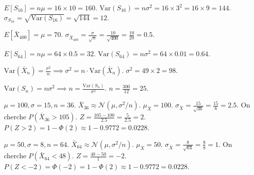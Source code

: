 \begin{correctionbox}
$E[S_{16}] = n\mu = 16 \times 10 = 160$.
$\text{Var}(S_{16}) = n\sigma^2 = 16 \times 3^2 = 16 \times 9 = 144$.
$\sigma_{S_{16}} = \sqrt{\text{Var}(S_{16})} = \sqrt{144} = 12$.
\end{correctionbox}

\begin{correctionbox}
$E[\bar{X}_{400}] = \mu = 70$.
$\sigma_{\bar{X}_{400}} = \frac{\sigma}{\sqrt{n}} = \frac{10}{\sqrt{400}} = \frac{10}{20} = 0.5$.
\end{correctionbox}

\begin{correctionbox}
$E[S_{64}] = n\mu = 64 \times 0.5 = 32$.
$\text{Var}(S_{64}) = n\sigma^2 = 64 \times 0.01 = 0.64$.
\end{correctionbox}

\begin{correctionbox}
$\text{Var}(\bar{X}_n) = \frac{\sigma^2}{n} \implies \sigma^2 = n \cdot \text{Var}(\bar{X}_n)$.
$\sigma^2 = 49 \times 2 = 98$.
\end{correctionbox}

\begin{correctionbox}
$\text{Var}(S_n) = n\sigma^2 \implies n = \frac{\text{Var}(S_n)}{\sigma^2}$.
$n = \frac{300}{12} = 25$.
\end{correctionbox}

\begin{correctionbox}
$\mu=100, \sigma=15, n=36$. $\bar{X}_{36} \approx \mathcal{N}(\mu, \sigma^2/n)$.
$\mu_{\bar{X}} = 100$. $\sigma_{\bar{X}} = \frac{15}{\sqrt{36}} = \frac{15}{6} = 2.5$.
On cherche $P(\bar{X}_{36} > 105)$.
$Z = \frac{105 - 100}{2.5} = \frac{5}{2.5} = 2$.
$P(Z > 2) = 1 - \Phi(2) \approx 1 - 0.9772 = 0.0228$.
\end{correctionbox}

\begin{correctionbox}
$\mu=50, \sigma=8, n=64$. $\bar{X}_{64} \approx \mathcal{N}(\mu, \sigma^2/n)$.
$\mu_{\bar{X}} = 50$. $\sigma_{\bar{X}} = \frac{8}{\sqrt{64}} = \frac{8}{8} = 1$.
On cherche $P(\bar{X}_{64} < 48)$.
$Z = \frac{48 - 50}{1} = -2$.
$P(Z < -2) = \Phi(-2) = 1 - \Phi(2) \approx 1 - 0.9772 = 0.0228$.
\end{correctionbox}

